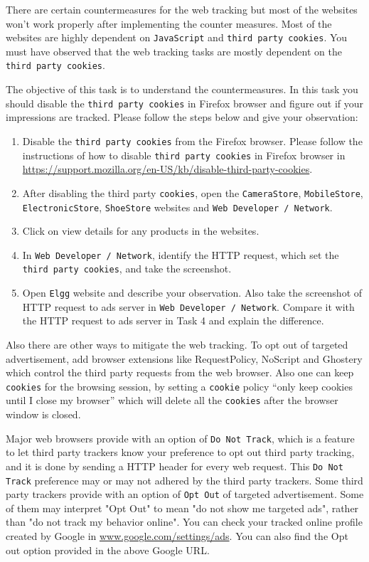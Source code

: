 There are certain countermeasures for the web tracking but most of the websites won’t work properly after implementing the counter measures. 
Most of the websites are highly dependent on {\tt JavaScript} and {\tt third party cookies}. 
You must have observed that the web tracking tasks are mostly dependent on the {\tt third party cookies}.

The objective of this task is to understand the countermeasures. 
In this task you should disable the {\tt third party cookies} in Firefox browser and figure out if your impressions are tracked. 
Please follow the steps below and give your observation:

\begin{enumerate}
  \item Disable the {\tt third party cookies} from the Firefox browser. Please follow the instructions of how to disable {\tt third party cookies} in Firefox browser in \url{https://support.mozilla.org/en-US/kb/disable-third-party-cookies}.
  \item After disabling the third party {\tt cookies}, open the {\tt CameraStore}, {\tt MobileStore}, {\tt ElectronicStore}, {\tt ShoeStore} websites and {\tt Web Developer / Network}.
  \item Click on view details for any products in the websites.
  \item In {\tt Web Developer / Network}, identify the HTTP request, which set the {\tt third party cookies}, and take the screenshot.
  \item Open {\tt Elgg} website and describe your observation. Also take the screenshot of HTTP request to ads server in {\tt Web Developer / Network}. Compare it with the HTTP request to ads server in Task 4 and explain the difference.

\end{enumerate}

Also there are other ways to mitigate the web tracking. To opt out of targeted advertisement, 
add browser extensions like RequestPolicy, NoScript and Ghostery which control the third party requests from the web browser. 
Also one can keep {\tt cookies} for the browsing session, by setting a {\tt cookie} policy “only keep cookies until I close my browser” 
which will delete all the {\tt cookies} after the browser window is closed. 

Major web browsers provide with an option of {\tt Do Not Track}, which is a feature to let third party trackers know your preference to opt out third party tracking, 
and it is done by sending a HTTP header for every web request. 
This {\tt Do Not Track} preference may or may not adhered by the third party trackers. 
Some third party trackers provide with an option of {\tt Opt Out} of targeted advertisement. 
Some of them may interpret "Opt Out" to mean "do not show me targeted ads", rather than "do not track my behavior online". 
You can check your tracked online profile created by Google in \url{www.google.com/settings/ads}. 
You can also find the Opt out option provided in the above Google URL.

